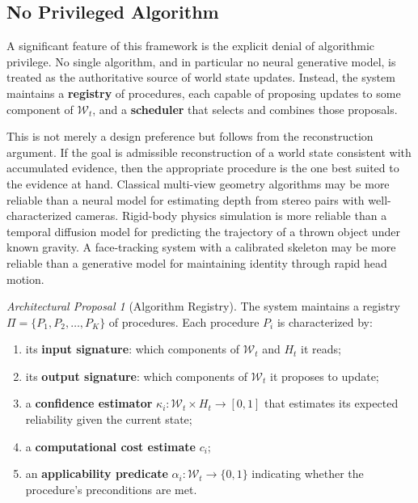\documentclass[11pt,a4paper]{article}
\theoremstyle{plain}
\theoremstyle{definition}
\theoremstyle{remark}
\newtheorem{proposal}[theorem]{Architectural Proposal}
\begin{document}
\subsection{No Privileged Algorithm}

A significant feature of this framework is the explicit denial of algorithmic privilege. No single algorithm, and in particular no neural generative model, is treated as the authoritative source of world state updates. Instead, the system maintains a \textbf{registry} of procedures, each capable of proposing updates to some component of $\mathcal{W}_t$, and a \textbf{scheduler} that selects and combines those proposals.

This is not merely a design preference but follows from the reconstruction argument. If the goal is admissible reconstruction of a world state consistent with accumulated evidence, then the appropriate procedure is the one best suited to the evidence at hand. Classical multi-view geometry algorithms \cite{hartley2003multiple} may be more reliable than a neural model for estimating depth from stereo pairs with well-characterized cameras. Rigid-body physics simulation is more reliable than a temporal diffusion model for predicting the trajectory of a thrown object under known gravity. A face-tracking system with a calibrated skeleton may be more reliable than a generative model for maintaining identity through rapid head motion.

\begin{proposal}[Algorithm Registry]
\label{prop:registry}
The system maintains a registry $\Pi = \{P_1, P_2, \ldots, P_K\}$ of procedures. Each procedure $P_i$ is characterized by:
\begin{enumerate}[leftmargin=2em,itemsep=0pt]
\item its \textbf{input signature}: which components of $\mathcal{W}_t$ and $H_t$ it reads;
\item its \textbf{output signature}: which components of $\mathcal{W}_t$ it proposes to update;
\item a \textbf{confidence estimator} $\kappa_i : \mathcal{W}_t \times H_t \to [0,1]$ that estimates its expected reliability given the current state;
\item a \textbf{computational cost estimate} $c_i$;
\item an \textbf{applicability predicate} $\alpha_i : \mathcal{W}_t \to \{0,1\}$ indicating whether the procedure's preconditions are met.
\end{enumerate}
\end{proposal}
\end{document}
